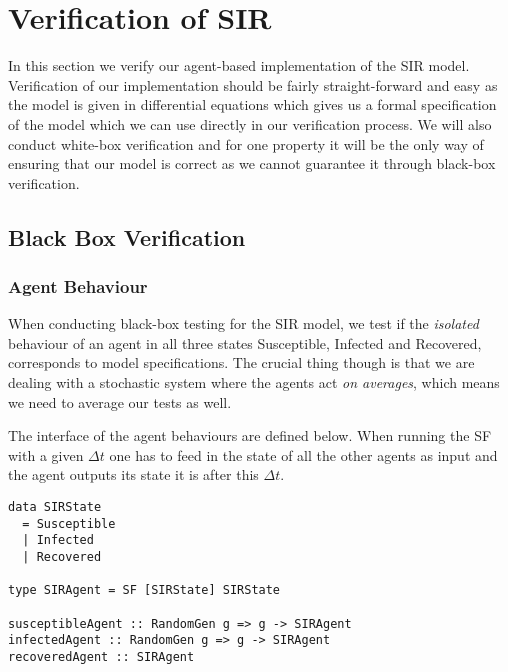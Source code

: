 \section{Verification of SIR}
In this section we verify our agent-based implementation of the SIR model. Verification of our implementation should be fairly straight-forward and easy as the model is given in differential equations which gives us a formal specification of the model which we can use directly in our verification process. We will also conduct white-box verification and for one property it will be the only way of ensuring that our model is correct as we cannot guarantee it through black-box verification.

\subsection{Black Box Verification}
\subsubsection{Agent Behaviour}
When conducting black-box testing for the SIR model, we test if the \textit{isolated} behaviour of an agent in all three states Susceptible, Infected and Recovered, corresponds to model specifications. The crucial thing though is that we are dealing with a stochastic system where the agents act \textit{on averages}, which means we need to average our tests as well.

The interface of the agent behaviours are defined below. When running the SF with a given $\Delta t$ one has to feed in the state of all the other agents as input and the agent outputs its state it is after this $\Delta t$.

\begin{verbatim}
data SIRState 
  = Susceptible 
  | Infected 
  | Recovered
  
type SIRAgent = SF [SIRState] SIRState

susceptibleAgent :: RandomGen g => g -> SIRAgent
infectedAgent :: RandomGen g => g -> SIRAgent
recoveredAgent :: SIRAgent
\end{verbatim}


